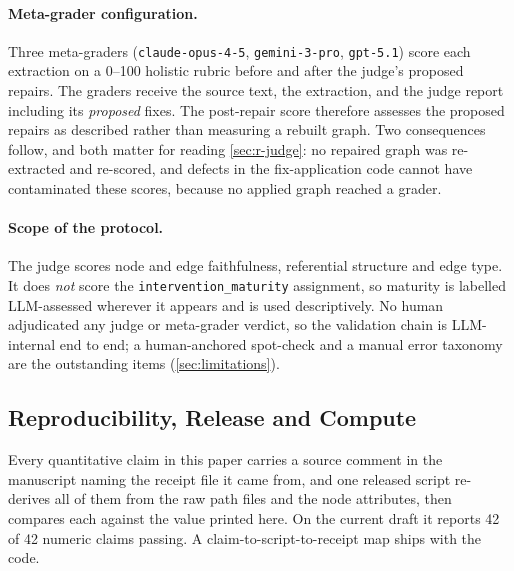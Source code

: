 \documentclass[10pt,twocolumn,letterpaper]{article}
\begin{document}
\paragraph{Meta-grader configuration.} Three meta-graders
(\texttt{claude-opus-4-5}, \texttt{gemini-3-pro}, \texttt{gpt-5.1}) score each extraction
on a 0--100 holistic rubric before and after the judge's proposed repairs. The graders
receive the source text, the extraction, and the judge report including its
\emph{proposed} fixes. The post-repair score therefore assesses the proposed repairs as
described rather than measuring a rebuilt graph. Two consequences follow, and both
matter for reading \cref{sec:r-judge}: no repaired graph was re-extracted and re-scored,
and defects in the fix-application code cannot have contaminated these scores, because
no applied graph reached a grader.

\paragraph{Scope of the protocol.} The judge scores node and edge faithfulness,
referential structure and edge type. It does \emph{not} score the
\texttt{intervention\_maturity} assignment, so maturity is labelled LLM-assessed
wherever it appears and is used descriptively. No human adjudicated any judge or
meta-grader verdict, so the validation chain is LLM-internal end to end; a
human-anchored spot-check and a manual error taxonomy are the outstanding items
(\cref{sec:limitations}).

\subsection{Reproducibility, Release and Compute}
\label{sec:m-repro}

Every quantitative claim in this paper carries a source comment in the manuscript naming
the receipt file it came from, and one released script re-derives all of them from the
raw path files and the node attributes, then compares each against the value printed
here. On the current draft it reports 42 of 42 numeric claims passing. A
claim-to-script-to-receipt map ships with the code.
\end{document}
